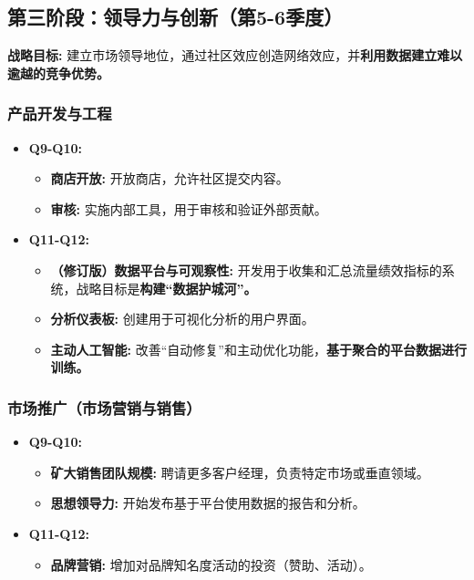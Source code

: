 \documentclass[11点, A4纸, 单面]{article}
\begin{document}
\subsection{第三阶段：领导力与创新（第5-6季度）}
\textbf{战略目标:} 建立市场领导地位，通过社区效应创造网络效应，并\textbf{利用数据建立难以逾越的竞争优势。}

\subsubsection{产品开发与工程}
\begin{itemize}[leftmargin=*]
    \item \textbf{Q9-Q10:}
    \begin{itemize}
        \item \textbf{商店开放:} 开放商店，允许社区提交内容。
        \item \textbf{审核:} 实施内部工具，用于审核和验证外部贡献。
    \end{itemize}
    \item \textbf{Q11-Q12:}
    \begin{itemize}
        \item \textbf{（修订版）数据平台与可观察性:} 开发用于收集和汇总流量绩效指标的系统，战略目标是\textbf{构建“数据护城河”。}
        \item \textbf{分析仪表板:} 创建用于可视化分析的用户界面。
        \item \textbf{主动人工智能:} 改善“自动修复”和主动优化功能，\textbf{基于聚合的平台数据进行训练。}
    \end{itemize}
\end{itemize}

\subsubsection{市场推广（市场营销与销售）}
\begin{itemize}[leftmargin=*]
    \item \textbf{Q9-Q10:}
    \begin{itemize}
        \item \textbf{矿大销售团队规模:} 聘请更多客户经理，负责特定市场或垂直领域。
        \item \textbf{思想领导力:} 开始发布基于平台使用数据的报告和分析。
    \end{itemize}
    \item \textbf{Q11-Q12:}
    \begin{itemize}
        \item \textbf{品牌营销:} 增加对品牌知名度活动的投资（赞助、活动）。
    \end{itemize}
\end{itemize}
\end{document}
